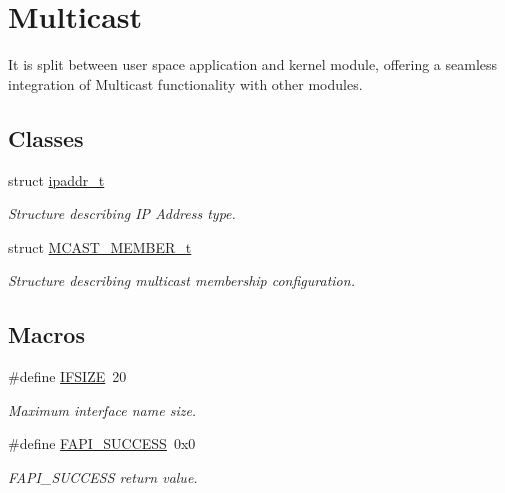 \hypertarget{group__FAPI__MCAST}{\section{Multicast}
\label{group__FAPI__MCAST}
}


It is split between user space application and kernel module, offering a seamless integration of Multicast functionality with other modules.  


\subsection*{Classes}
\begin{DoxyCompactItemize}
\item 
struct \hyperlink{structipaddr__t}{ipaddr\-\_\-t}
\begin{DoxyCompactList}\small\item\em Structure describing I\-P Address type. \end{DoxyCompactList}\item 
struct \hyperlink{structMCAST__MEMBER__t}{M\-C\-A\-S\-T\-\_\-\-M\-E\-M\-B\-E\-R\-\_\-t}
\begin{DoxyCompactList}\small\item\em Structure describing multicast membership configuration. \end{DoxyCompactList}\end{DoxyCompactItemize}
\subsection*{Macros}
\begin{DoxyCompactItemize}
\item 
\hypertarget{group__FAPI__MCAST_gaa55207000cd9168578be60cca21141e6}{\#define \hyperlink{group__FAPI__MCAST_gaa55207000cd9168578be60cca21141e6}{I\-F\-S\-I\-Z\-E}~20}\label{group__FAPI__MCAST_gaa55207000cd9168578be60cca21141e6}

\begin{DoxyCompactList}\small\item\em Maximum interface name size. \end{DoxyCompactList}\item 
\hypertarget{group__FAPI__MCAST_gaeafdc97c74222a08b365112551cffbf6}{\#define \hyperlink{group__FAPI__MCAST_gaeafdc97c74222a08b365112551cffbf6}{F\-A\-P\-I\-\_\-\-S\-U\-C\-C\-E\-S\-S}~0x0}\label{group__FAPI__MCAST_gaeafdc97c74222a08b365112551cffbf6}

\begin{DoxyCompactList}\small\item\em F\-A\-P\-I\-\_\-\-S\-U\-C\-C\-E\-S\-S return value. \end{DoxyCompactList}\end{DoxyCompactItemize}
